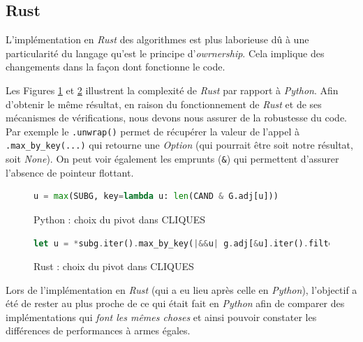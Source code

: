 \documentclass[12pt,a4paper]{article}
\begin{document}
\subsection{Rust}%
\label{subsec:rust}

L'implémentation en \emph{Rust} des algorithmes est plus laborieuse dû à une particularité du langage qu'est le principe d'\emph{owrnership}\cite{rust}. Cela implique des changements dans la façon dont fonctionne le code.

Les Figures \ref{fig:p1} et \ref{fig:r1} illustrent la complexité de \emph{Rust} par rapport à \emph{Python}. Afin d'obtenir le même résultat, en raison du fonctionnement de \emph{Rust} et de ses mécanismes de vérifications, nous devons nous assurer de la robustesse du code. Par exemple le \verb|.unwrap()| permet de récupérer la valeur de l'appel à \verb|.max_by_key(...)| qui retourne une \emph{Option} (qui pourrait être soit notre résultat, soit \emph{None}). On peut voir également les emprunts (\texttt{\&}) qui permettent d'assurer l'absence de pointeur flottant.

\begin{figure}[ht]
  \begin{lstlisting}[language=Python]
    u = max(SUBG, key=lambda u: len(CAND & G.adj[u]))
  \end{lstlisting}
  \caption{Python : choix du pivot dans CLIQUES}
  \label{fig:p1}
\end{figure}

\begin{figure}[ht]
  \begin{lstlisting}[language=Rust]
    let u = *subg.iter().max_by_key(|&&u| g.adj[&u].iter().filter(|&&neighbor| cand.contains(&neighbor)).count()).unwrap();
  \end{lstlisting}
  \caption{Rust : choix du pivot dans CLIQUES}
  \label{fig:r1}
\end{figure}

Lors de l'implémentation en \emph{Rust} (qui a eu lieu après celle en \emph{Python}), l'objectif a été de rester au plus proche de ce qui était fait en \emph{Python} afin de comparer des implémentations qui \og \textit{font les mêmes choses} \fg{} et ainsi pouvoir constater les différences de performances à armes égales.
\end{document}
